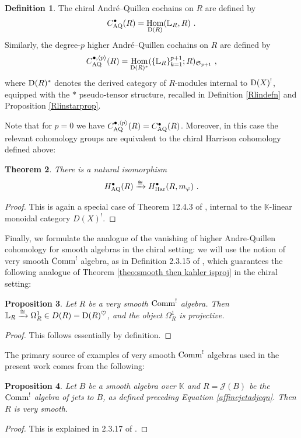 \documentclass[11pt]{amsart}
\numberwithin{equation}{section}
\newtheorem{theo}{Theorem}[section]
\newtheorem{prop}[theo]{Proposition}
\theoremstyle{definition}
\newtheorem{defn}[theo]{Definition}
\newcommand{\bb}{\mathbb}
\newcommand{\mf}{\mathfrak}
\newcommand{\AQ}{{\textup{AQ}}}
\newcommand{\bL}{{\mathbb{L}}}
\DeclareMathOperator{\Hom}{Hom}
\newcommand{\K}{{\bb K}}
\newcommand{\Comm}{{\textup{Comm}}}
\newcommand{\Ss}{{{\mf{S}}}}
\newcommand{\0}{{\textbf{0}}}
\newcommand{\Dd}{{\textup{D}}}
\newcommand{\DD}{{D}}
\def \mf{\mathfrak}
\begin{document}
\begin{defn}\label{AQchDefn} 
The chiral Andr\'e--Quillen cochains on $R$ are defined by
	\[ C^\bullet_\AQ(R)= \Hom_{\Dd(R)}(\bL_R,R) \ .  \]
	Similarly, the degree-$p$ higher Andr\'e--Quillen cochains on $R$ are defined by
	\[ C^{\bullet,\langle p \rangle}_\AQ(R)= \Hom_{\Dd(R)^*}(\{\bL_R\}_{k=1}^{p+1};R)_{\Ss_{p+1}} \ ,  \]
	where $\Dd(R)^*$ denotes the derived category of $R$-modules internal to $\Dd(X)^!$, equipped with the $*$ pseudo-tensor structure, recalled in Definition \ref{Rlindefn} and Proposition \ref{Rlinstarprop}.
\end{defn}
Note that for $p=0$ we have $ C^{\bullet,\langle p \rangle}_\AQ(R)= C^\bullet_\AQ(R)$. Moreover, in this case the relevant cohomology groups are equivalent to the chiral Harrison cohomology defined above:
\begin{theo} There is a natural isomorphism
	\[ 
	H^\bullet_\AQ(R)\xrightarrow{\cong} H^\bullet_{\textup{Har}}(R,m_\varphi) \ . 
	\]
\end{theo}
\begin{proof}
	This is again a special case of Theorem 12.4.3 of \cite{LV}, internal to the $\K$-linear monoidal category $\DD(X)^!$.
\end{proof}



Finally, we formulate the analogue of the vanishing of higher Andre-Quillen cohomology for smooth algebras in the chiral setting: we will use the notion of very smooth $\Comm^!$ algebra, as in Definition 2.3.15 of \cite{BD1}, which guarantees the following analogue of Theorem \ref{theo:smooth then kahler isproj} in the chiral setting:

\begin{prop}\label{verysmoothprop} Let $R$ be a very smooth $\Comm^!$ algebra. Then $\bL_R\xrightarrow{\cong} \Omega_R^1\in \DD(R)=\Dd(R)^\heartsuit$, and the object $\Omega_R^1$ is projective.
\end{prop}
\begin{proof} This follows essentially by definition.
\end{proof}


The primary source of examples of very smooth $\Comm^!$ algebras used in the present work comes from the following:

\begin{prop} Let $B$ be a smooth algebra over $\K$ and $R=\mathcal{J}(B)$ be the $\Comm^!$ algebra of jets to $B$, as defined preceding Equation \ref{affinejetadjeqn}. Then $R$ is very smooth.
\end{prop}
\begin{proof}
	This is explained in 2.3.17 of \cite{BD1}.
\end{proof}
\end{document}
